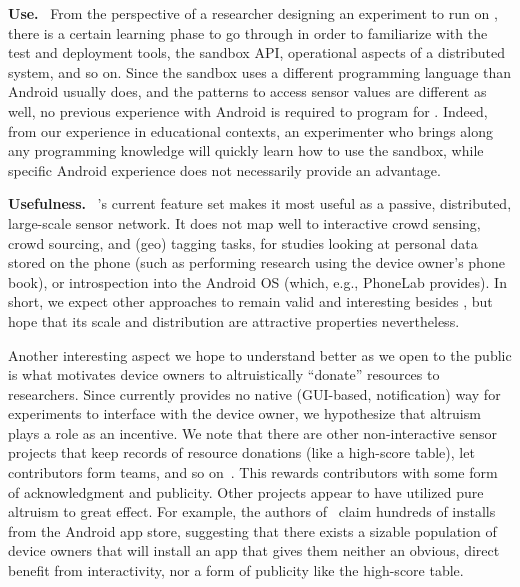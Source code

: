 \textbf{Use.}~
From the perspective of a researcher designing an experiment to 
run on \sysname, there is a certain learning phase 
to go through in order to familiarize with the test and deployment 
tools, the sandbox API, operational aspects of a distributed system, 
and so on. Since the sandbox uses a different programming language 
than Android usually does, and the patterns to access sensor values 
are different as well, no previous experience with Android is required 
to program for \sysname. Indeed, from our experience in 
educational contexts, an experimenter who brings along any programming 
knowledge will quickly learn how to use the sandbox, while specific 
Android experience does not necessarily provide an advantage.


\textbf{Usefulness.}~
\sysname's current feature set makes it most 
useful as a passive, distributed, large-scale sensor network. 
It does not map well to interactive crowd sensing, crowd sourcing, 
and (geo) tagging tasks, for studies looking at personal data stored 
on the phone (such as performing research using the device owner's 
phone book),
or introspection into the Android OS (which, e.g., PhoneLab provides). 
In short, we expect other approaches to remain valid and interesting 
besides \sysname, but hope that its scale and distribution 
are attractive properties nevertheless.


Another interesting aspect we hope to understand better as 
we open \sysname to the public is what motivates device 
owners to altruistically ``donate'' resources to researchers. 
Since \sysname currently provides no native (GUI-based, 
notification) way for experiments to interface with the device 
owner, we hypothesize that altruism plays a role as an incentive. 
We note that there are other non-interactive sensor projects that 
keep records of 
resource donations (like a high-score table), let contributors form 
teams, and so on~\cite{OpenWLANMap}.
This rewards contributors with some form of acknowledgment and 
publicity. Other projects appear to have utilized pure altruism to 
great effect. For example, the authors of~\cite{wang2011untold} 
claim hundreds of installs from the Android app 
store, suggesting that there exists a sizable population of device 
owners that will install an app that gives them neither an obvious, 
direct benefit from interactivity, nor a form of publicity like 
the high-score table.


